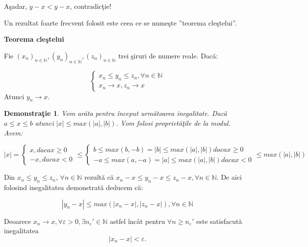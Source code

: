 \documentclass[a4paper,12pt,oneside]{report}
\newtheorem{demonstration}{Demonstra\c tie}
\begin{document}
A\c sadar, \(y-x < y-x\), contradic\c tie!

Un rezultat foarte frecvent folosit este ceea ce se nume\c ste ”teorema cle\c stelui”.

\textbf{Teorema cle\c stelui}

Fie \((x_{n})_{n\in \mathbb{N}}, (y_{n})_{n\in \mathbb{N}},(z_{n})_{n\in \mathbb{N}} \) trei \c siruri de numere reale. 
Dac\u a:

\[\left\{\begin{matrix}
x_{n} \leq  y_{n} \leq z_{n}, \forall  n \in \mathbb{N}\\ 
x_{n} \to x, z_{n} \rightarrow x

\end{matrix}\right. \]
Atunci \(y_{n} \to x\).

\begin{demonstration}
  Vom ar\u ata pentru \^ inceput urm\u atoarea inegalitate. Dac\u a \(a \leq x\leq b\) atunci \(\left | x \right | \leq  max (\left | a \right |, \left | b \right |) \). 
Vom folosi propriet\u a\c tile de la modul. Avem:
\end{demonstration}


\begin{displaymath}
  \left | x \right | = \left\{\begin{matrix} x, daca x \geq 0\\ -x, daca x< 0 \end{matrix}\right. \leq \left\{\begin{matrix} b\leq max(b,-b) = \left | b \right |\leq max(\left | a \right |,\left | b \right |) daca x\geq 0\\  -a\leq max(a,-a) = \left | a \right | 
  \leq max (\left | a \right |,\left | b \right |) daca x< 0 \end{matrix}\right. \leq max (\left | a \right |, \left | b \right |)
\end{displaymath}
 

Din \(x_{n} \leq y_{n}\leq z_{n}\), \(\forall n\in \mathbb{N} \) rezult\u a c\u a \(x_{n}-x \leq y_{n}-x \leq z_{n}-x, \forall n\in \mathbb{N}. \)
De aici folosind inegalitatea demonstrat\u a deducem c\u a:

\[\left | y_{n} - x \right |\leq max (\left | x_{n}-x \right |, \left | z_{n} - x \right |),\forall n\in \mathbb{N} \label{eq:1.1} \tag{1.1}\]


Deoarece \(x_{n} \to x, \forall \varepsilon > 0, \exists {n_{\varepsilon }}'\in \mathbb{N}\) astfel \^ inc\^ at pentru \(\forall n \geq {n_{\varepsilon }}'\) este satisfacut\u a inegalitatea \[\left | x_{n}-x \right |< \varepsilon.\label{eq:1.2} \tag{1.2} \]
	
\end{document}
